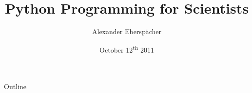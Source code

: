 \documentclass[compress]{beamer}
\title %
{Python Programming for Scientists}
\author %
{Alexander Eberspächer}
\date[]{October 12\textsuperscript{th} 2011} %
\begin{document}
\begin{frame} %
  \titlepage
  \thispagestyle{empty}
\end{frame}

\begin{frame}{Outline} %
  \tableofcontents
\end{frame}






\end{document}

